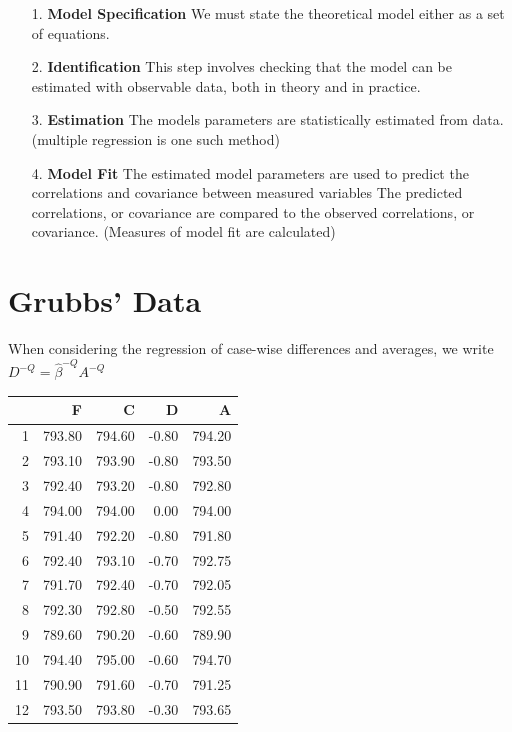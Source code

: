 \documentclass[12pt, a4paper]{report}
\theoremstyle{plain}
\theoremstyle{definition}
\theoremstyle{remark}
\begin{document}
	\begin{itemize}
		\item[1.] \textbf{Model Specification}
		We must state the theoretical model either as a set of equations.
		
		\item[2.] \textbf{Identification }
		This step involves checking that the model can be estimated with observable data, both in theory and in practice.
		
		\item[3.] \textbf{Estimation}
		The models parameters are statistically estimated from data. (multiple regression is one such method)
		
		\item[4.] \textbf{Model Fit}
		The estimated model parameters are used to predict the correlations and covariance between measured variables 
		The predicted correlations, or covariance are compared to the observed correlations, or covariance. (Measures of model fit are calculated)
	\end{itemize}
	
	\section{Grubbs' Data} %
	
	When considering the regression of case-wise differences and averages, we write $D^{-Q} = \hat{\beta}^{-Q}A^{-Q}$
	
	
	
	
	\begin{table}[ht]
		\begin{center}
			\begin{tabular}{rrrrr}
				\hline
				& F & C & D & A \\
				\hline
				1 & 793.80 & 794.60 & -0.80 & 794.20 \\
				2 & 793.10 & 793.90 & -0.80 & 793.50 \\
				3 & 792.40 & 793.20 & -0.80 & 792.80 \\
				4 & 794.00 & 794.00 & 0.00 & 794.00 \\
				5 & 791.40 & 792.20 & -0.80 & 791.80 \\
				6 & 792.40 & 793.10 & -0.70 & 792.75 \\
				7 & 791.70 & 792.40 & -0.70 & 792.05 \\
				8 & 792.30 & 792.80 & -0.50 & 792.55 \\
				9 & 789.60 & 790.20 & -0.60 & 789.90 \\
				10 & 794.40 & 795.00 & -0.60 & 794.70 \\
				11 & 790.90 & 791.60 & -0.70 & 791.25 \\
				12 & 793.50 & 793.80 & -0.30 & 793.65 \\
				\hline
			\end{tabular}
		\end{center}
	\end{table}
	
\end{document}
